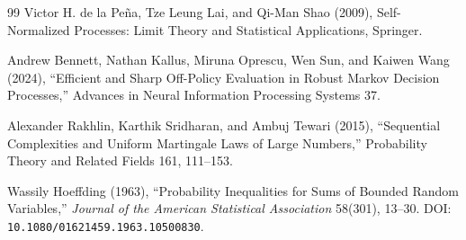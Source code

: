\documentclass{article}
\begin{document}
\begin{thebibliography}{99}
   Victor H. de la Peña, Tze Leung Lai, and Qi-Man Shao (2009), Self-Normalized Processes: Limit Theory and Statistical Applications, Springer.

   Andrew Bennett, Nathan Kallus, Miruna Oprescu, Wen Sun, and Kaiwen Wang (2024), ``Efficient and Sharp Off-Policy Evaluation in Robust Markov Decision Processes,'' Advances in Neural Information Processing Systems 37.

   Alexander Rakhlin, Karthik Sridharan, and Ambuj Tewari (2015), ``Sequential Complexities and Uniform Martingale Laws of Large Numbers,'' Probability Theory and Related Fields 161, 111--153.

   Wassily Hoeffding (1963), ``Probability Inequalities for Sums of Bounded Random Variables,'' \emph{Journal of the American Statistical Association} 58(301), 13--30. DOI: \texttt{10.1080/01621459.1963.10500830}.

\end{thebibliography}
\end{document}
